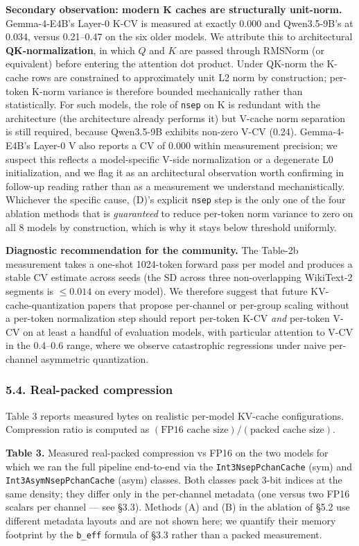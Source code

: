 \textbf{Secondary observation: modern K caches are structurally
unit-norm.} Gemma-4-E4B's Layer-0 K-CV is measured at exactly 0.000 and
Qwen3.5-9B's at 0.034, versus 0.21--0.47 on the six older models. We
attribute this to architectural \textbf{QK-normalization}, in which
\(Q\) and \(K\) are passed through RMSNorm (or equivalent) before
entering the attention dot product. Under QK-norm the K-cache rows are
constrained to approximately unit L2 norm by construction; per-token
K-norm variance is therefore bounded mechanically rather than
statistically. For such models, the role of \texttt{nsep} on K is
redundant with the architecture (the architecture already performs it)
but V-cache norm separation is still required, because Qwen3.5-9B
exhibits non-zero V-CV (0.24). Gemma-4-E4B's Layer-0 V also reports a CV
of 0.000 within measurement precision; we suspect this reflects a
model-specific V-side normalization or a degenerate L0 initialization,
and we flag it as an architectural observation worth confirming in
follow-up reading rather than as a measurement we understand
mechanistically. Whichever the specific cause, (D)'s explicit
\texttt{nsep} step is the only one of the four ablation methods that is
\emph{guaranteed} to reduce per-token norm variance to zero on all 8
models by construction, which is why it stays below threshold uniformly.

\textbf{Diagnostic recommendation for the community.} The Table-2b
measurement takes a one-shot 1024-token forward pass per model and
produces a stable CV estimate across seeds (the SD across three
non-overlapping WikiText-2 segments is \(\leq 0.014\) on every model).
We therefore suggest that future KV-cache-quantization papers that
propose per-channel or per-group scaling without a per-token
normalization step should report per-token K-CV \emph{and} per-token
V-CV on at least a handful of evaluation models, with particular
attention to V-CV in the 0.4--0.6 range, where we observe catastrophic
regressions under naive per-channel asymmetric quantization.

\subsubsection{5.4. Real-packed
compression}\label{real-packed-compression}

Table 3 reports measured bytes on realistic per-model KV-cache
configurations. Compression ratio is computed as
\((\text{FP16 cache size}) / (\text{packed cache size})\).

\textbf{Table 3.} Measured real-packed compression vs FP16 on the two
models for which we ran the full pipeline end-to-end via the
\texttt{Int3NsepPchanCache} (sym) and \texttt{Int3AsymNsepPchanCache}
(asym) classes. Both classes pack 3-bit indices at the same density;
they differ only in the per-channel metadata (one versus two FP16
scalars per channel --- see §3.3). Methods (A) and (B) in the ablation
of §5.2 use different metadata layouts and are not shown here; we
quantify their memory footprint by the \texttt{b\_eff} formula of §3.3
rather than a packed measurement.

